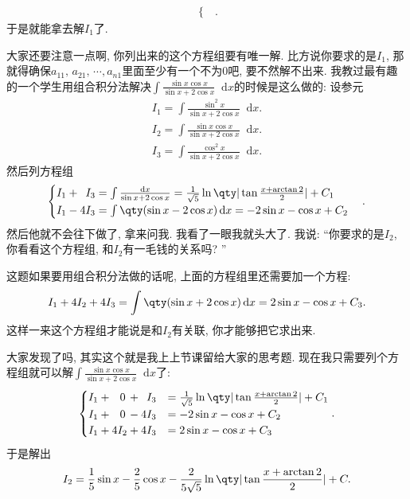 \documentclass{ctexbook}
\newcommand*{\dif}{\mathop{}\!\mathrm{d}}
\begin{document}
{\begin{align*}
\begin{cases}
\end{cases}
.\end{align*}
于是就能拿去解$I_{1}$了. \par
大家还要注意一点啊, 你列出来的这个方程组要有唯一解. 比方说你要求的是$I_{1}$, 那就得确保$a_{11},\,a_{21},\,\cdots,a_{n1}$里面至少有一个不为$0$吧, 要不然解不出来. 我教过最有趣的一个学生用组合积分法解决$\int\frac{\sin{x}\cos{x}}{\sin{x}+2\cos{x}}\dif{x}$的时候是这么做的: 设参元
\begin{align*}
I_{1}=\int\frac{\sin^{2}{x}}{\sin{x}+2\cos{x}}\dif{x}.\\
I_{2}=\int\frac{\sin{x}\cos{x}}{\sin{x}+2\cos{x}}\dif{x}.\\
I_{3}=\int\frac{\cos^{2}{x}}{\sin{x}+2\cos{x}}\dif{x}
.\end{align*}
然后列方程组
\begin{align*}
\begin{cases}
I_{1}+\;\:I_{3}=\int\frac{\dif{x}}{\sin{x}+2\cos{x}}=\frac{1}{\sqrt{5}}\ln\qty|\tan{\frac{x+\arctan{2}}{2}}|+C_{1}\\
I_{1}-4I_{3}=\int\qty(\sin{x}-2\cos{x})\dif{x}=-2\sin{x}-\cos{x}+C_{2}
\end{cases}
.\end{align*}
然后他就不会往下做了, 拿来问我. 我看了一眼我就头大了. 我说: “你要求的是$I_{2}$, 你看看这个方程组, 和$I_{2}$有一毛钱的关系吗? ”\par
这题如果要用组合积分法做的话呢, 上面的方程组里还需要加一个方程: 
\begin{align*}
I_{1}+4I_{2}+4I_{3}=\int\qty(\sin{x}+2\cos{x})\dif{x}=2\sin{x}-\cos{x}+C_{3}
.\end{align*}
这样一来这个方程组才能说是和$I_{2}$有关联, 你才能够把它求出来. \par
大家发现了吗, 其实这个就是我上上节课留给大家的思考题. 现在我只需要列个方程组就可以解$\int\frac{\sin{x}\cos{x}}{\sin{x}+2\cos{x}}\dif{x}$了: 
\begin{align*}
\begin{cases}
I_{1}+\;\;\,0\,+\;\:I_{3}&=\frac{1}{\sqrt{5}}\ln\qty|\tan{\frac{x+\arctan{2}}{2}}|+C_{1}\\
I_{1}+\;\;\,0\,-4I_{3}&=-2\sin{x}-\cos{x}+C_{2}\\
I_{1}+4I_{2}+4I_{3}&=2\sin{x}-\cos{x}+C_{3}
\end{cases}
.\end{align*}
于是解出
\begin{align*}
I_{2}=\frac{1}{5}\sin{x}-\frac{2}{5}\cos{x}-\frac{2}{5\sqrt{5}}\ln\qty|\tan{\frac{x+\arctan{2}}{2}}|+C
.\end{align*}\par
}
\end{document}
